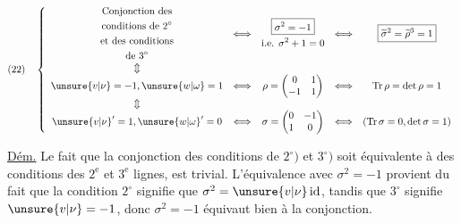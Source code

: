 \[
(22)\quad
\left\{
\begin{array}{ccccc}
\begin{gathered}
\text{Conjonction des}\\
\text{conditions de }2^\circ\\
\text{et des conditions}\\
\text{de }3^\circ
\end{gathered}
&\Longleftrightarrow&
\begin{gathered}\boxed{\sigma^2=-1}\\
\text{i.e. }\sigma^2+1=0\end{gathered}
&\Longleftrightarrow&
\boxed{\widetilde\sigma^2=\widetilde\rho^3=1}
\\
\Updownarrow&&&&\\
\unsure{v|\nu}=-1,\unsure{w|\omega}=1&\Longleftrightarrow&
\rho=\begin{pmatrix}0&1\\-1&1\end{pmatrix}
&\Longleftrightarrow&\operatorname{Tr}\rho=\det\rho=1
\\
\Updownarrow&&&&\\
\unsure{v|\nu}'=1,\unsure{w|\omega}'=0&\Longleftrightarrow&
\sigma=\begin{pmatrix}0&-1\\1&0\end{pmatrix}
&\Longleftrightarrow&(\operatorname{Tr}\sigma=0,\det\sigma=1)
\end{array}\right.
\]

\uline{Dém.} Le fait que la conjonction des conditions de $2^\circ)$ et $3^\circ)$ soit équivalente à  des conditions des $2^{\mathrm e}$ et $3^{\mathrm e}$ lignes, est trivial. L'équivalence avec $\sigma^2=-1$ provient du fait que  la condition $2^\circ$ signifie que  $\sigma^2=\unsure{v|\nu}\,\mathrm{id}$,  tandis que $3^\circ$ signifie $\unsure{v|\nu}=-1$, donc $\sigma^2=-1$ équivaut bien à la conjonction.


